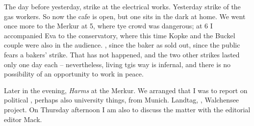 
The day before yesterday, strike at the electrical works. Yesterday strike of the gas workers. So now the cafe is open, but one sits in the dark at home. We went once more to the Merkur at 5, where tye crowd was dangerous; at 6 I accompanied Eva to the conservatory, where this time Kopke and the Buckel couple were also in the audience. , since the baker as sold out, since the public fears a bakers' strike. That has not happened, and the two other strikes lasted only one day each -- nevertheless, living tgis way is infernal, and there is no possibility of an opportunity to work in peace.

\missing

Later in the evening, \textit{Harms} at the Merkur. We arranged that I was to report on political , perhaps also university things, from Munich. Landtag, , Walchensee project. On Thursday afternoon I am also to discuss the matter with the editorial editor Mack.